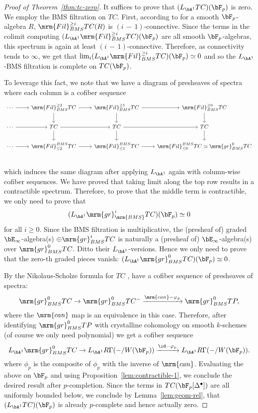 \documentclass[a4paper,10pt]{amsart}
\begin{document}
\begin{proof}[Proof of Theorem~\ref{thm:tc-zero}]  It suffices to prove that $(L_{\bA^1}TC)(\bF_p)$ is zero. We employ the BMS filtration on $TC$. First, according to \cite[Theorem 5.1(1)]{AMMN} for a smooth $\bF_p$-algebra $R$, $\mrm{Fil}_{BMS}^{\geq i}TC(R)$ is $(i\,-\,1)$-connective. Since the terms in the colimit computing $(L_{\bA^1}\mrm{Fil}^{\geq i}_{BMS}TC)(\bF_p)$ are all smooth $\bF_p$-algebras, this spectrum is again at least $(i\,-\,1)$-connective. Therefore, as connectivity tends to $\infty$, we get that $\lim_i (L_{\bA^1}\mrm{Fil}^{\geq i}_{BMS}TC)(\bF_p) \simeq 0$ and so the $L_{\bA^1}$-BMS filtration is complete on $TC(\bF_p)$. 

To leverage this fact, we note that we have a diagram of presheaves of spectra where each column is a cofiber sequence
\begin{equation} \label{eq:tc-diagram}
\begin{tikzcd}
\ar{r} \cdots & \mrm{Fil}^{\geq 2}_{BMS}TC \ar{r} \ar{d} & \mrm{Fil}^{\geq 1}_{BMS}TC \ar{d} \ar{r} & \mrm{Fil}^{\geq 0}_{BMS}TC \ar{d}\\
\ar{r} \cdots & TC \ar{r} \ar{d} & TC \ar{r} \ar{d} & TC \ar{d} \\
\ar{r} \cdots & \mrm{Fil}^{BMS}_{\leq 2}TC \ar{r}  & \mrm{Fil}_{\leq 1}^{BMS}TC \ar{r} & \mrm{Fil}_{\leq 0}^{BMS}TC \simeq \mrm{gr}^0_{BMS}TC\\
\end{tikzcd}
\end{equation}
which induces the same diagram after applying $L_{\bA^1}$ again with column-wise cofiber sequences. We have proved that taking limit along the top row results in a contractible spectrum. Therefore, to prove that the middle term is contractible, we only need to prove that 
\[
(L_{\bA^1}\mrm{gr}^i_{\mrm{BMS}}TC)(\bF_p) \simeq 0
\]
for all $i \geq 0$. Since the BMS filtration is multiplicative, the (presheaf of) graded $\bE_{\infty}$-algebra(s) $\oplus \mrm{gr}^i_{BMS}TC$ is naturally a (presheaf of) $\bE_{\infty}$-algebra(s) over $\mrm{gr}^0_{BMS}TC$. Ditto their $L_{\bA^1}$-versions. Hence we only need to prove that the zero-th graded pieces vanish: $(L_{\bA^1}\mrm{gr}^0_{BMS}TC)(\bF_p) \simeq 0$. 

By the Nikolaus-Scholze formula for $TC$ \cite{nikolaus-scholze}, have a cofiber sequence of presheaves of spectra:
\[
\mrm{gr}^0_{BMS}TC \rightarrow \mrm{gr}^0_{BMS}TC^{-} \xrightarrow{\mrm{can} - \phi_p} \mrm{gr}^0_{BMS}TP,
\]
where the $\mrm{can}$ map is an equivalence in this case. Therefore, after identifying $\mrm{gr}_{BMS}^0TP$ with crystalline cohomology on smooth $k$-schemes (of course we only need polynomial) we get a cofiber sequence
\[
L_{\bA^1}\mrm{gr}^0_{BMS}TC \rightarrow L_{\bA^1}R\Gamma(-/W(\bF_p)) \xrightarrow{\id - \phi_p} L_{\bA^1}R\Gamma(-/W(\bF_p)).
\]
where $\phi_p$ is the composite of $\phi_p$ with the inverse of $\mrm{can}$. Evaluating the above on $\bF_p$ and using Proposition~\ref{lem:contractible-1}, we conclude the desired result after $p$-completion. Since the terms in $TC(\bF_p[\Delta^{\bullet}])$ are all uniformly bounded below, we conclude by Lemma~\ref{lem:geom-rel}, that $(L_{\bA^1}TC)(\bF_p)$ is already $p$-complete and hence actually zero.


\end{proof}
\end{document}
